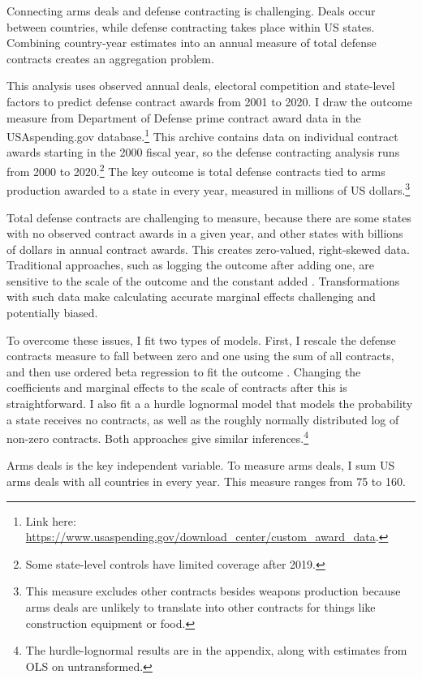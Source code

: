 \documentclass[12pt]{article}
\begin{document}
Connecting arms deals and defense contracting is challenging. 
Deals occur between countries, while defense contracting takes place within US states. 
Combining country-year estimates into an annual measure of total defense contracts creates an aggregation problem. 


This analysis uses observed annual deals, electoral competition and state-level factors to predict defense contract awards from 2001 to 2020. 
I draw the outcome measure from Department of Defense prime contract award data in the USAspending.gov database.\footnote{Link here: \url{https://www.usaspending.gov/download_center/custom_award_data}.} 
This archive contains data on individual contract awards starting in the 2000 fiscal year, so the defense contracting analysis runs from 2000 to 2020.\footnote{Some state-level controls have limited coverage after 2019.}
The key outcome is total defense contracts tied to arms production awarded to a state in every year, measured in millions of US dollars.\footnote{This measure excludes other contracts besides weapons production because arms deals are unlikely to translate into other contracts for things like construction equipment or food.}


Total defense contracts are challenging to measure, because there are some states with no observed contract awards in a given year, and other states with billions of dollars in annual contract awards. 
This creates zero-valued, right-skewed data. 
Traditional approaches, such as logging the outcome after adding one, are sensitive to the scale of the outcome and the constant added \citep{ChenRoth2022, MullahyNorton2022}. 
Transformations with such data make calculating accurate marginal effects challenging and potentially biased. 


To overcome these issues, I fit two types of models.
First, I rescale the defense contracts measure to fall between zero and one using the sum of all contracts, and then use ordered beta regression to fit the outcome \citep{Kubinec2022}. 
Changing the coefficients and marginal effects to the scale of contracts after this is straightforward. 
I also fit a a hurdle lognormal model that models the probability a state receives no contracts, as well as the roughly normally distributed log of non-zero contracts. 
Both approaches give similar inferences.\footnote{The hurdle-lognormal results are in the appendix, along with estimates from OLS on untransformed.} 


Arms deals is the key independent variable.  
To measure arms deals, I sum US arms deals with all countries in every year. 
This measure ranges from 75 to 160. 
\end{document}
